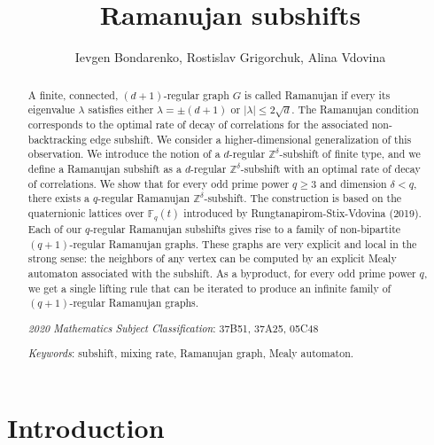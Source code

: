 \documentclass[12pt]{article}
\author{Ievgen Bondarenko, Rostislav Grigorchuk, Alina Vdovina}
\title{\textbf{Ramanujan subshifts}}
\theoremstyle{definition}
\begin{document}
\maketitle

\begin{abstract}
A finite, connected, $(d+1)$-regular graph $G$ is called Ramanujan if every its eigenvalue $\lambda$ satisfies either $\lambda=\pm (d+1)$ or $|\lambda|\leq 2\sqrt{d}$. The Ramanujan condition corresponds to the optimal rate of decay of correlations for the associated non-backtracking edge subshift. We consider a higher-dimensional generalization of this observation. We introduce the notion of a $d$-regular $\mathbb{Z}^{\delta}$-subshift of finite type, and we define a Ramanujan subshift as a $d$-regular $\mathbb{Z}^{\delta}$-subshift with an optimal rate of decay of correlations. We show that for every odd prime power $q\geq 3$ and dimension $\delta<q$, there exists a $q$-regular Ramanujan $\mathbb{Z}^{\delta}$-subshift. The construction is based on the quaternionic lattices over $\mathbb{F}_q(t)$ introduced by Rungtanapirom-Stix-Vdovina (2019). Each of our $q$-regular Ramanujan subshifts gives rise to a family of non-bipartite $(q+1)$-regular Ramanujan graphs. These graphs are very explicit and local in the strong sense: the neighbors of any vertex can be computed by an explicit Mealy automaton associated with the subshift. As a byproduct, for every odd prime power $q$, we get a single lifting rule that can be iterated to produce an infinite family of $(q+1)$-regular Ramanujan graphs.

%

\vspace{0.1cm}\textit{2020 Mathematics Subject Classification}: 37B51, 37A25, 05C48

\textit{Keywords}: subshift, mixing rate, Ramanujan graph, Mealy automaton.
\end{abstract}



\section{Introduction}
\end{document}
